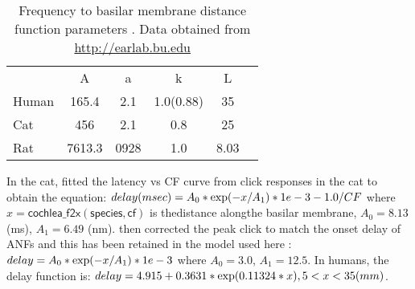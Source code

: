\begin{table}[ht]
  \centering
  \begin{tabular}{lccccc}
    \hline
    &   A   &   a  &     k     & L \\
    Human & 165.4 &  2.1 & 1.0(0.88) & 35\\
    Cat  &  456  &  2.1 &    0.8    & 25 \\
    Rat  & 7613.3& 0928 &    1.0    & 8.03 \\
    \hline
  \end{tabular}
  \caption[Basilar membrane frequency-distance function parameters]{Frequency to basilar membrane distance function parameters \citep{FitzGeraldBurkittEtAl:2001}. Data obtained from \url{http://earlab.bu.edu} \label{tab:f2x}}
\end{table}

In the cat, \citet{CarneyYin:1988} fitted the latency vs CF curve from click
responses in the cat to obtain the equation: \( delay (msec) = A_0 * {\rm exp}(
-x / A_1 ) * 1e-3 - 1.0/CF \) where $x = \mathsf{cochlea\_f2x(species, cf)}$ is
thedistance alongthe basilar membrane, $A_0 = 8.13$ (ms), $A_1 = 6.49$
(nm). \citet{HeinzZhangEtAl:2001} then corrected the peak click to match the
onset delay of ANFs and this has been retained in the model used here
\citep{ZilanyBruceEtAl:2009}: \(delay = A_0 * {\rm exp}(-x / A_1) * 1e-3 \)
where $A_0 = 3.0$, $A_1 = 12.5$. In humans, the delay function is: \( delay =
4.915 + 0.3631 * {\rm exp}(0.11324*x) , 5<x<35 (mm) \).



